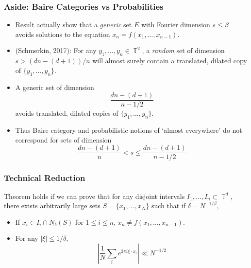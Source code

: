\documentclass[handout,usenames,dvipsnames]{beamer}
\DeclareMathOperator{\TT}{\mathbb{T}}
\begin{document}
\begin{frame}
    \frametitle{Aside: Baire Categories vs Probabilities}

    \begin{itemize}
        \item Result actually show that a \emph{generic} set $E$ with Fourier dimension $s \leq \beta$ avoids solutions to the equation $x_n = f(x_1,\dots,x_{n-1})$.

        \item (Schmerkin, 2017): For any $y_1,\dots,y_n \in \TT^2$, a \emph{random} set of dimension $s > (dn - (d+1))/n$ will almost surely contain a translated, dilated copy of $\{ y_1, \dots, y_n \}$.

        \item A generic set of dimension
        \[ \frac{dn - (d+1)}{n - 1/2} \]
        avoids translated, dilated copies of $\{ y_1, \dots, y_n \}$.

        \item Thus Baire category and probabilistic notions of `almost everywhere'   do not correspond for sets of dimension
        \[ \frac{dn - (d+1)}{n} < s \leq \frac{dn - (d+1)}{n-1/2} \]
    \end{itemize}
\end{frame}

\begin{frame}
    \frametitle{Technical Reduction}

    Theorem holds if we can prove that for any disjoint intervals $I_1,\dots,I_n \subset \TT^d$, there exists arbitrarily large sets $S = \{ x_1,\dots,x_N \}$ such that if $\delta = N^{-1/\beta}$,
    \begin{itemize}
        \item If $x_i \in I_i \cap N_\delta(S)$ for $1 \leq i \leq n$, $x_n \neq f(x_1,\dots,x_{n-1})$.
        \item For any $|\xi| \leq 1/\delta$,
        \[ \left| \frac{1}{N} \sum_i e^{2 \pi i \xi \cdot x_i} \right| \ll N^{-1/2} \]
    \end{itemize}
\end{frame}
\end{document}
